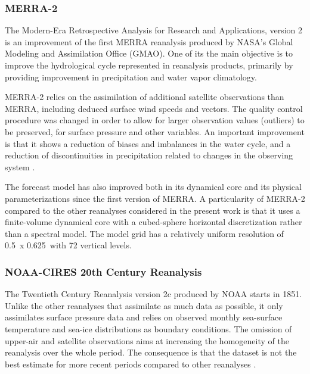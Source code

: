 \documentclass{ametsoc}
\begin{document}
\subsubsection{MERRA-2}

The Modern-Era Retrospective Analysis for Research and Applications, version 2  \citep[MERRA-2, ][]{Gelaro2017} is an improvement of the first MERRA reanalysis \citep{Rienecker2011} produced by NASA's Global Modeling and Assimilation Office (GMAO). One of its the main objective is to improve the hydrological cycle represented in reanalysis products, primarily by providing improvement in precipitation and water vapor climatology.

MERRA-2 relies on the assimilation of additional satellite observations than MERRA, including deduced surface wind speeds and vectors. The quality control procedure was changed in order to allow for larger observation values (outliers) to be preserved, for surface pressure and other variables. An important improvement is that it shows a reduction of biases and imbalances in the water cycle, and a reduction of discontinuities in precipitation related to changes in the observing system \citep{Gelaro2017}.

The forecast model has also improved both in its dynamical core and its physical parameterizations since the first version of MERRA. A particularity of MERRA-2 compared to the other reanalyses considered in the present work is that it uses a finite-volume dynamical core with a cubed-sphere horizontal discretization rather than a spectral model. The model grid has a relatively uniform resolution of 0.5\degree\ x 0.625\degree\ with 72 vertical levels.


\subsubsection{NOAA-CIRES 20th Century Reanalysis}

The Twentieth Century Reanalysis version 2c \citep[20CR-2c, ][]{Compo2011} produced by NOAA starts in 1851. Unlike the other reanalyses that assimilate as much data as possible, it only assimilates surface pressure data and relies on observed monthly sea-surface temperature and sea-ice distributions as boundary conditions. The omission of upper-air and satellite observations aims at increasing the homogeneity of the reanalysis over the whole period. The consequence is that the dataset is not the best estimate for more recent periods compared to other reanalyses \citep{Poli2017}.
\end{document}
